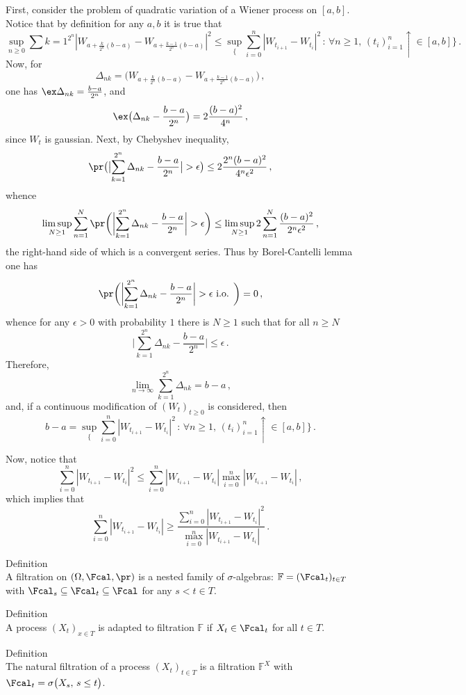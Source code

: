First, consider the problem of quadratic variation of a Wiener process on $[a,b]$.
Notice that by definition for any $a,b$ it is true that
\[
	\sup_{n\geq 0} \sum{k=1}^{2^n} | W_{a+\frac{k}{2^n}(b-a)}-W_{a+\frac{k-1}{2^n}(b-a)} |^2 
		\leq \sup_\bigl\{ \sum_{i=0}^n |W_{t_{i+1}}-W_{t_i}|^2\,:\,
						  \forall n\geq 1,\,(t_i)_{i=1}^n\uparrow\in [a,b] \bigr\}
 \,. \]
Now, for 
\[ \Delta_{nk} = \bigl( W_{a+\frac{k}{2^n}(b-a)}-W_{a+\frac{k-1}{2^n}(b-a)} \bigr)^\,,\]
one has $\ex \Delta_{nk} = \frac{b-a}{2^n}$, and 
\[ \ex\bigl(\Delta_{nk} - \frac{b-a}{2^n}\bigr) = 2\frac{(b-a)^2}{4^n} \,, \]
since $W_t$ is gaussian. Next, by Chebyshev inequality,
\[ \pr\bigl(\bigl| \sum_{k=1}^{2^n} \Delta_{nk} - \frac{b-a}{2^n}\bigr| > \epsilon \bigr)
	\leq 2\frac{2^n (b-a)^2}{4^n \epsilon^2}\,, \]
whence
\[
	\limsup_{N\geq1} \sum_{n=1}^N \pr\biggl(
			\biggl| \sum_{k=1}^{2^n} \Delta_{nk} - \frac{b-a}{2^n}\biggr| > \epsilon
		\biggr) \leq \limsup_{N\geq1} 2\sum_{n=1}^N\frac{(b-a)^2}{2^n \epsilon^2}
	\,,\]
the right-hand side of which is a convergent series. Thus by Borel-Cantelli lemma
one has
\[\pr\biggl( \biggl| \sum_{k=1}^{2^n} \Delta_{nk} - \frac{b-a}{2^n}\biggr| > \epsilon
				\text{ i.o. } \biggr) = 0 \,, \]
whence for any $\epsilon > 0$ with probability $1$ there is $N\geq1$ such that
for all $n\geq N$
\[ \biggl| \sum_{k=1}^{2^n} \Delta_{nk} - \frac{b-a}{2^n}\biggr| \leq \epsilon \,. \]
Therefore, 
\[ \lim_{n\to\infty} \sum_{k=1}^{2^n} \Delta_{nk} = b-a \,, \]
and, if a continuous modification of $(W_t)_{t\geq 0}$ is considered, then
\[ b-a = \sup_\bigl\{ \sum_{i=0}^n |W_{t_{i+1}}-W_{t_i}|^2\,:\,
					  \forall n\geq 1,\,(t_i)_{i=1}^n\uparrow\in [a,b] \bigr\} \,. \]

Now, notice that
\[ \sum_{i=0}^n |W_{t_{i+1}}-W_{t_i}|^2 \leq
	\sum_{i=0}^n |W_{t_{i+1}}-W_{t_i}| \max_{i=0}^n |W_{t_{i+1}}-W_{t_i}| \,,\]
which implies that
\[ \sum_{i=0}^n |W_{t_{i+1}}-W_{t_i}|
	\geq \frac{\sum_{i=0}^n |W_{t_{i+1}}-W_{t_i}|^2}{\max_{i=0}^n |W_{t_{i+1}}-W_{t_i}|} \,. \]

\noindent Definition\hfill\\
A filtration on $(\Omega, \Fcal, \pr)$ is a nested family of $\sigma$-algebras:
$\mathbb{F} = (\Fcal_t)_{t\in T}$ with $\Fcal_s\subseteq\Fcal_t\subseteq\Fcal$
for any $s<t\in T$.

\noindent Definition\hfill\\
A process $(X_t)_{x\in T}$ is adapted to filtration $\mathbb{F}$ if $X_t\in \Fcal_t$
for all $t\in T$.

\noindent Definition\hfill\\
The natural filtration of a process $(X_t)_{t\in T}$ is a filtration $\mathbb{F}^X$
with $\Fcal_t = \sigma\bigl(X_s,\, s\leq t\bigr)$.

